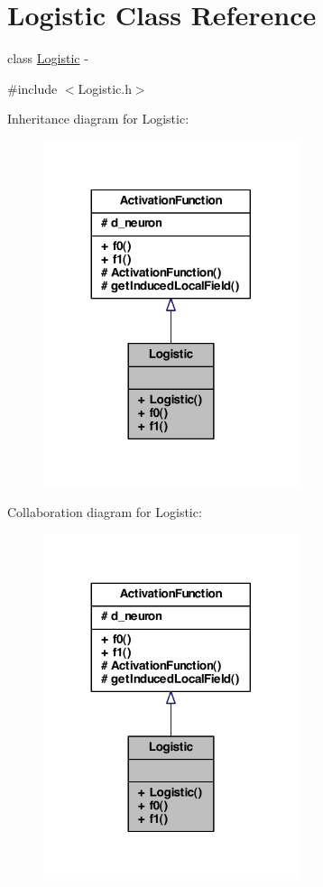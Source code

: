 \hypertarget{class_logistic}{
\section{Logistic Class Reference}
\label{class_logistic}
}


class \hyperlink{class_logistic}{Logistic} -\/  




{\ttfamily \#include $<$Logistic.h$>$}



Inheritance diagram for Logistic:\nopagebreak
\begin{figure}[H]
\begin{center}
\leavevmode
\includegraphics[width=212pt]{class_logistic__inherit__graph}
\end{center}
\end{figure}


Collaboration diagram for Logistic:\nopagebreak
\begin{figure}[H]
\begin{center}
\leavevmode
\includegraphics[width=212pt]{class_logistic__coll__graph}
\end{center}
\end{figure}
